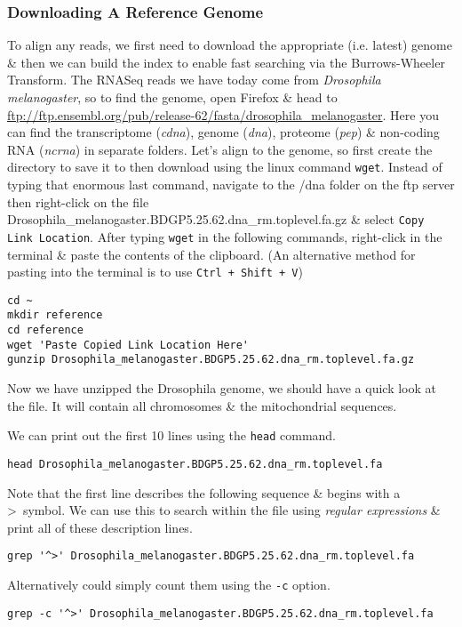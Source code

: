 \subsubsection{Downloading A Reference Genome}
\begin{steps}
To align any reads, we first need to download the appropriate (i.e. latest) genome \& then we can build the index to enable fast searching via the Burrows-Wheeler Transform.
The RNASeq reads we have today come from \textit{Drosophila melanogaster}, so to find the genome, open Firefox \& head to \url{ftp://ftp.ensembl.org/pub/release-62/fasta/drosophila\_melanogaster}.
Here you can find the transcriptome (\textit{cdna}), genome (\textit{dna}), proteome (\textit{pep}) \& non-coding RNA (\textit{ncrna}) in separate folders.
Let's align to the genome, so first create the directory to save it to then download using the linux command \texttt{wget}.
Instead of typing that enormous last command, navigate to the /dna folder on the ftp server then right-click on the file Drosophila\_melanogaster.BDGP5.25.62.dna\_rm.toplevel.fa.gz \& select \texttt{Copy Link Location}.
After typing \texttt{wget} in the following commands, right-click in the terminal \& paste the contents of the clipboard.
(An alternative method for pasting into the terminal is to use \texttt{Ctrl + Shift + V})
\begin{lstlisting}
cd ~
mkdir reference
cd reference
wget 'Paste Copied Link Location Here'
gunzip Drosophila_melanogaster.BDGP5.25.62.dna_rm.toplevel.fa.gz
\end{lstlisting}
\end{steps}

\begin{information}
Now we have unzipped the Drosophila genome, we should have a quick look at the file.
It will contain all chromosomes \& the mitochondrial sequences.
\end{information}

\begin{steps}
We can print out the first 10 lines using the \texttt{head} command.
\begin{lstlisting}
head Drosophila_melanogaster.BDGP5.25.62.dna_rm.toplevel.fa    
\end{lstlisting}
Note that the first line describes the following sequence \& begins with a \textgreater ~symbol.
We can use this to search within the file using \textit{regular expressions} \& print all of these description lines.
\begin{lstlisting}
grep '^>' Drosophila_melanogaster.BDGP5.25.62.dna_rm.toplevel.fa
\end{lstlisting}
Alternatively could simply count them using the \texttt{-c} option.
\begin{lstlisting}
grep -c '^>' Drosophila_melanogaster.BDGP5.25.62.dna_rm.toplevel.fa  
\end{lstlisting}
\end{steps}

